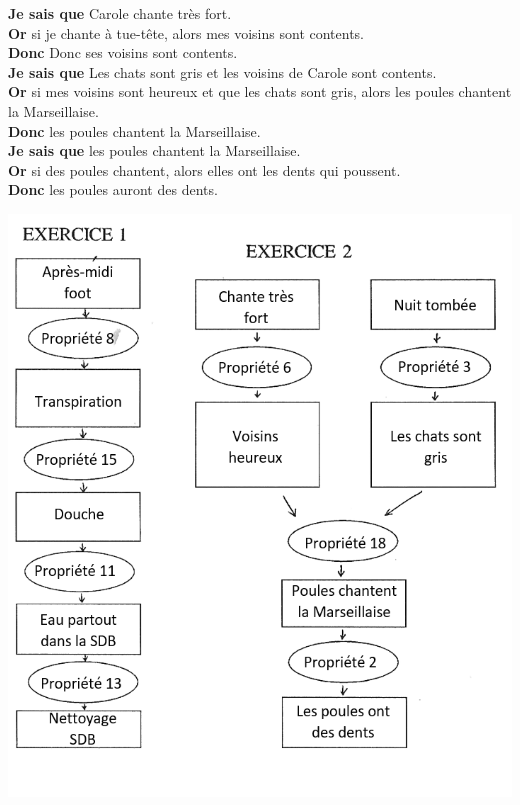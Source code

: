 \documentclass[12pt,a4paper]{article}
\begin{document}
\noindent \textbf{Je sais que} Carole chante très fort.\\
\textbf{Or} si je chante à tue-tête, alors mes voisins sont contents.\\
\textbf{Donc} Donc ses voisins sont contents.\\

\noindent \textbf{Je sais que} Les chats sont gris et les voisins de Carole sont contents.\\
\textbf{Or} si mes voisins sont heureux et que les chats sont gris, alors les poules chantent la Marseillaise.\\
\textbf{Donc} les poules chantent la Marseillaise.\\

\noindent \textbf{Je sais que} les poules chantent la Marseillaise.\\
\textbf{Or} si des poules chantent, alors elles ont les dents qui poussent.\\
\textbf{Donc} les poules auront des dents.\\

\begin{center}
	\includegraphics[scale=0.9]{demo_1-2}

\end{center}
\end{document}
